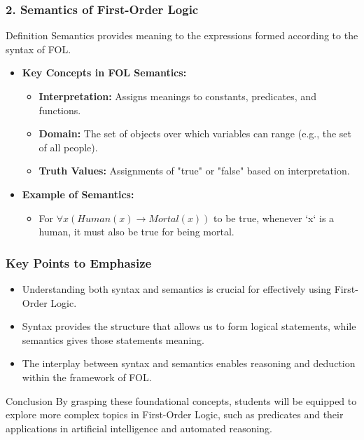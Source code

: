 \documentclass[aspectratio=169]{beamer}
\begin{document}
\begin{frame}[fragile]
    \frametitle{2. Semantics of First-Order Logic}
    \begin{block}{Definition}
        Semantics provides meaning to the expressions formed according to the syntax of FOL.
    \end{block}
    \begin{itemize}
        \item \textbf{Key Concepts in FOL Semantics:}
            \begin{itemize}
                \item \textbf{Interpretation:} Assigns meanings to constants, predicates, and functions.
                \item \textbf{Domain:} The set of objects over which variables can range (e.g., the set of all people).
                \item \textbf{Truth Values:} Assignments of "true" or "false" based on interpretation.
            \end{itemize}
        \item \textbf{Example of Semantics:}
            \begin{itemize}
                \item For $\forall x (Human(x) \rightarrow Mortal(x))$ to be true, whenever `x` is a human, it must also be true for being mortal.
            \end{itemize}
    \end{itemize}
\end{frame}

\begin{frame}[fragile]
    \frametitle{Key Points to Emphasize}
    \begin{itemize}
        \item Understanding both syntax and semantics is crucial for effectively using First-Order Logic.
        \item Syntax provides the structure that allows us to form logical statements, while semantics gives those statements meaning.
        \item The interplay between syntax and semantics enables reasoning and deduction within the framework of FOL.
    \end{itemize}
    \begin{block}{Conclusion}
        By grasping these foundational concepts, students will be equipped to explore more complex topics in First-Order Logic, such as predicates and their applications in artificial intelligence and automated reasoning.
    \end{block}
\end{frame}
\end{document}
